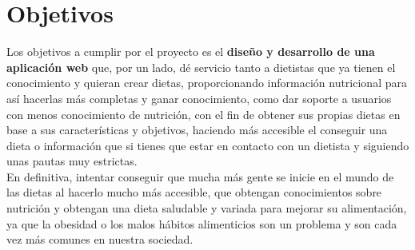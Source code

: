 \section{Objetivos} \label{sec:objetivos}

Los objetivos \cite{objetivos} a cumplir por el proyecto es el \textbf{diseño y desarrollo de una aplicación web} que, por un lado, dé servicio tanto a dietistas
que ya tienen el conocimiento y quieran crear dietas, proporcionando información nutricional para así hacerlas más completas y ganar 
conocimiento, como dar soporte a usuarios con menos conocimiento de nutrición, con el fin de obtener sus propias dietas en base a sus características y objetivos,
haciendo más accesible el conseguir una dieta o información que si tienes que estar en contacto con un dietista y siguiendo unas pautas muy estrictas.\\

En definitiva, intentar conseguir que mucha más gente se inicie en el mundo de las dietas al hacerlo mucho 
más accesible, que obtengan conocimientos sobre nutrición y obtengan una dieta saludable y variada para mejorar su alimentación,
ya que la obesidad o los malos hábitos alimenticios son un problema y son cada vez más comunes en nuestra sociedad.
